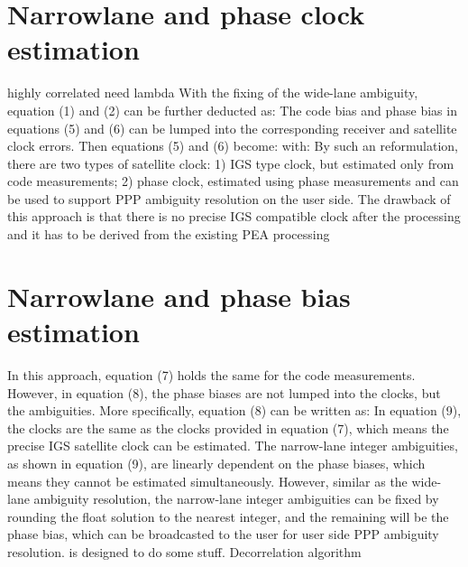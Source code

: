 \section{Narrowlane and phase clock estimation}
%
highly correlated need lambda
%
%
With the fixing of the wide-lane ambiguity, equation (1) and (2) can be further deducted as:
%
The code bias and phase bias in equations (5) and (6) can be lumped into the corresponding receiver
and satellite clock errors. Then equations (5) and (6) become:
%
with:
%
By such an reformulation, there are two types of satellite clock: 1) IGS type clock, but estimated only
from code measurements; 2) phase clock, estimated using phase measurements and can be used to
support PPP ambiguity resolution on the user side. The drawback of this approach is that there is no
precise IGS compatible clock after the processing and it has to be derived from the existing PEA
processing
%
\section{Narrowlane and phase bias estimation}
%
In this approach, equation (7) holds the same for the code measurements. However, in equation (8),
the phase biases are not lumped into the clocks, but the ambiguities. More specifically, equation (8)
can be written as:
%
In equation (9), the clocks are the same as the clocks provided in equation (7), which means the
precise IGS satellite clock can be estimated.
The narrow-lane integer ambiguities, as shown in equation (9), are linearly dependent on the phase
biases, which means they cannot be estimated simultaneously. However, similar as the wide-lane
ambiguity resolution, the narrow-lane integer ambiguities can be fixed by rounding the float solution
to the nearest integer, and the remaining will be the phase bias, which can be broadcasted to the
user for user side PPP ambiguity resolution.
%
 is designed to do some stuff.
%
%
%
Decorrelation algorithm
%
%
